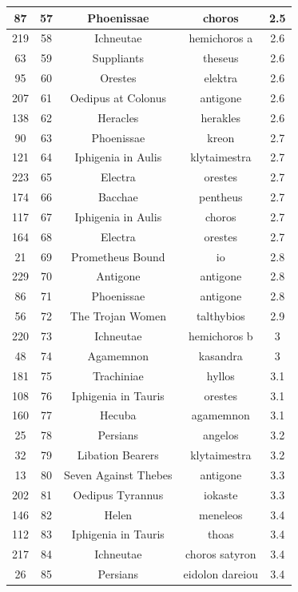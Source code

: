 \documentclass{jcls}
\begin{document}
\begin{longtable}{|c|c|c|c|c|}
  87 & 57 & Phoenissae & choros & 2.5 \\ \hline
  219 & 58 & Ichneutae & hemichoros a & 2.6 \\ \hline
  63 & 59 & Suppliants & theseus & 2.6 \\ \hline
  95 & 60 & Orestes & elektra & 2.6 \\ \hline
  207 & 61 & Oedipus at Colonus & antigone & 2.6 \\ \hline
  138 & 62 & Heracles & herakles & 2.6 \\ \hline
  90 & 63 & Phoenissae & kreon & 2.7 \\ \hline
  121 & 64 & Iphigenia in Aulis & klytaimestra & 2.7 \\ \hline
  223 & 65 & Electra & orestes & 2.7 \\ \hline
  174 & 66 & Bacchae & pentheus & 2.7 \\ \hline
  117 & 67 & Iphigenia in Aulis & choros & 2.7 \\ \hline
  164 & 68 & Electra & orestes & 2.7 \\ \hline
  21 & 69 & Prometheus Bound & io & 2.8 \\ \hline
  229 & 70 & Antigone & antigone & 2.8 \\ \hline
  86 & 71 & Phoenissae & antigone & 2.8 \\ \hline
  56 & 72 & The Trojan Women & talthybios & 2.9 \\ \hline
  220 & 73 & Ichneutae & hemichoros b & 3 \\ \hline
  48 & 74 & Agamemnon & kasandra & 3 \\ \hline
  181 & 75 & Trachiniae & hyllos & 3.1 \\ \hline
  108 & 76 & Iphigenia in Tauris & orestes & 3.1 \\ \hline
  160 & 77 & Hecuba & agamemnon & 3.1 \\ \hline
  25 & 78 & Persians & angelos & 3.2 \\ \hline
  32 & 79 & Libation Bearers & klytaimestra & 3.2 \\ \hline
  13 & 80 & Seven Against Thebes & antigone & 3.3 \\ \hline
  202 & 81 & Oedipus Tyrannus & iokaste & 3.3 \\ \hline
  146 & 82 & Helen & meneleos & 3.4 \\ \hline
  112 & 83 & Iphigenia in Tauris & thoas & 3.4 \\ \hline
  217 & 84 & Ichneutae & choros satyron & 3.4 \\ \hline
  26 & 85 & Persians & eidolon dareiou & 3.4 \\ \hline

\end{longtable}
\end{document}
